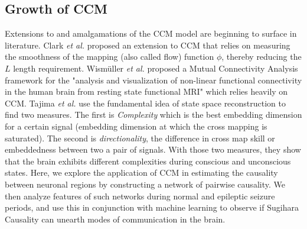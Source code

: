 \subsection{Growth of CCM}
Extensions to and amalgamations of the CCM model are beginning to surface in literature. Clark \textit{et al.} proposed an extension to CCM that relies on measuring the smoothness of the mapping (also called flow) function $\phi$, thereby reducing the $L$ length requirement\cite{Clark2015}.  Wismüller \textit{et al.} proposed a Mutual Connectivity Analysis framework for the "analysis and visualization of non-linear functional connectivity in the human brain from resting state functional MRI" \cite{wismuller2014} which relies heavily on CCM. Tajima \textit{\textit{et al.}} use the fundamental idea of state space reconstruction to find two measures. The first is \textit{Complexity} which is the best embedding dimension for a certain signal (embedding dimension at which the cross mapping is saturated). The second is \textit{directionality}, the difference in cross map skill or embeddedness between two a pair of signals. With those two measures, they show that the brain exhibits different complexities during conscious and unconscious states. Here, we explore the application of CCM in estimating the causality between neuronal regions by constructing a network of pairwise causality. We then analyze features of such networks during normal and epileptic seizure periods, and use this in conjunction with machine learning to observe if Sugihara Causality can unearth modes of communication in the brain.

